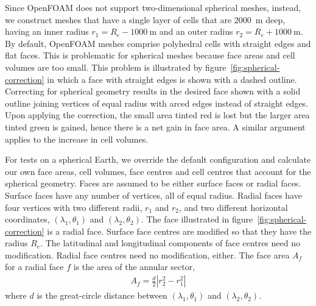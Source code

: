 Since OpenFOAM does not support two-dimensional spherical meshes, instead, we construct meshes that have a single layer of cells that are \SI{2000}{\meter} deep, having an inner radius $r_1 = R_e - \SI{1000}{\meter}$ and an outer radius $r_2 = R_e + \SI{1000}{\meter}$.  
By default, OpenFOAM meshes comprise polyhedral cells with straight edges and flat faces.  This is problematic for spherical meshes because face areas and cell volumes are too small.  This problem is illustrated by figure~\ref{fig:spherical-correction} in which a face with straight edges is shown with a dashed outline.
Correcting for spherical geometry results in the desired face shown with a solid outline joining vertices of equal radius with arced edges instead of straight edges.  Upon applying the correction, the small area tinted red is lost but the larger area tinted green is gained, hence there is a net gain in face area.  A similar argument applies to the increase in cell volumes.

For tests on a spherical Earth, we override the default configuration and calculate our own face areas, cell volumes, face centres and cell centres that account for the spherical geometry.  
Faces are assumed to be either surface faces or radial faces.  Surface faces have any number of vertices, all of equal radius.  Radial faces have four vertices with two different radii, $r_1$ and $r_2$, and two different horizontal coordinates, $(\lambda_1, \theta_1)$ and $(\lambda_2, \theta_2)$.  The face illustrated in figure~\ref{fig:spherical-correction} is a radial face.
Surface face centres are modified so that they have the radius $R_e$.  The latitudinal and longitudinal components of face centres need no modification.  Radial face centres need no modification, either.
The face area $A_f$ for a radial face $f$ is the area of the annular sector,
\begin{align}
	A_f = \frac{d}{2} \left\lvert r_2^2 - r_1^2 \right\rvert
\end{align}
where $d$ is the great-circle distance between $(\lambda_1, \theta_1)$ and $(\lambda_2, \theta_2)$.

